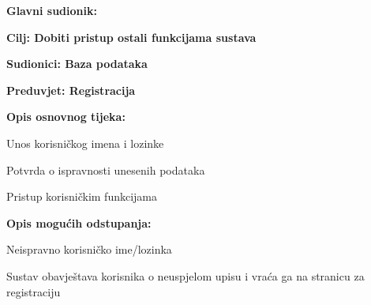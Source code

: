 	
	\noindent {}
	\begin{packed_item}
		
		\item \textbf{Glavni sudionik: }
		\item  \textbf{Cilj: Dobiti pristup ostali funkcijama sustava} 
		\item  \textbf{Sudionici: Baza podataka} 
		\item  \textbf{Preduvjet: Registracija} 
		\item  \textbf{Opis osnovnog tijeka: }
		
		\item[] \begin{packed_enum}
			
			\item Unos korisničkog imena i lozinke
			\item Potvrda o ispravnosti unesenih podataka
			\item Pristup korisničkim funkcijama
			
		\end{packed_enum}
		
		\item  \textbf{Opis mogućih odstupanja:}
		
		\item[] \begin{packed_item}
			
			\item[2.a] Neispravno korisničko ime/lozinka
			\item[] \begin{packed_enum}
				
				\item  Sustav obavještava korisnika o neuspjelom upisu i vraća ga na stranicu za registraciju
				
				
			\end{packed_enum}
			
			
		\end{packed_item}
	\end{packed_item}
	
	
	
